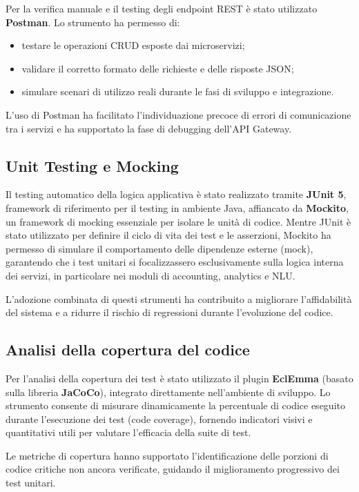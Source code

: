 Per la verifica manuale e il testing degli endpoint REST è stato utilizzato \textbf{Postman}.
Lo strumento ha permesso di:
\begin{itemize}
    \item testare le operazioni CRUD esposte dai microservizi;
    \item validare il corretto formato delle richieste e delle risposte JSON;
    \item simulare scenari di utilizzo reali durante le fasi di sviluppo e integrazione.
\end{itemize}

L’uso di Postman ha facilitato l’individuazione precoce di errori di comunicazione tra i servizi e ha supportato la fase di debugging dell’API Gateway.

\subsection{Unit Testing e Mocking}

Il testing automatico della logica applicativa è stato realizzato tramite \textbf{JUnit 5}, framework di riferimento per il testing in ambiente Java, affiancato da \textbf{Mockito}, un framework di mocking essenziale per isolare le unità di codice.
Mentre JUnit è stato utilizzato per definire il ciclo di vita dei test e le asserzioni, Mockito ha permesso di simulare il comportamento delle dipendenze esterne (mock), garantendo che i test unitari si focalizzassero esclusivamente sulla logica interna dei servizi, in particolare nei moduli di accounting, analytics e NLU.

L’adozione combinata di questi strumenti ha contribuito a migliorare l’affidabilità del sistema e a ridurre il rischio di regressioni durante l’evoluzione del codice.

\subsection{Analisi della copertura del codice}

Per l’analisi della copertura dei test è stato utilizzato il plugin \textbf{EclEmma} (basato sulla libreria \textbf{JaCoCo}), integrato direttamente nell’ambiente di sviluppo.
Lo strumento consente di misurare dinamicamente la percentuale di codice eseguito durante l’esecuzione dei test (code coverage), fornendo indicatori visivi e quantitativi utili per valutare l’efficacia della suite di test.

Le metriche di copertura hanno supportato l’identificazione delle porzioni di codice critiche non ancora verificate, guidando il miglioramento progressivo dei test unitari.

